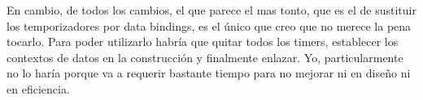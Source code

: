 En cambio, de todos los cambios, el que parece el mas tonto, que es el de sustituir los temporizadores por data bindings,
es el \'unico que creo que no merece la pena tocarlo. Para poder utilizarlo habr\'ia que quitar todos los timers,
establecer los contextos de datos en la construcci\'on y finalmente enlazar. Yo, particularmente no lo har\'ia porque
va a requerir bastante tiempo para no mejorar ni en dise\~no ni en eficiencia.